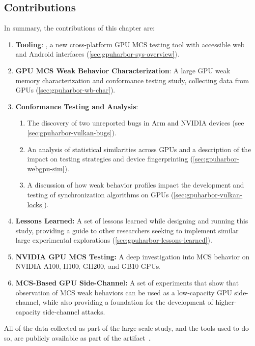 \subsection{Contributions}

In summary, the contributions of this chapter are:
\begin{enumerate}
    \item \textbf{Tooling}: \gpuharbor, a new cross-platform GPU MCS testing tool with accessible web and Android interfaces (\mysec\ref{sec:gpuharbor-sys-overview}).

    \item \textbf{GPU MCS Weak Behavior Characterization}: A large GPU weak memory characterization and conformance testing study, collecting data from \totalDevices GPUs (\mysec\ref{sec:gpuharbor-wb-char}).

    \item \textbf{Conformance Testing and Analysis}:
        \begin{enumerate}
            \item The discovery of two unreported bugs in Arm and NVIDIA devices (see \mysec\ref{sec:gpuharbor-vulkan-bugs}).
            \item An analysis of statistical similarities across GPUs and a description of the impact on testing strategies and device fingerprinting (\mysec\ref{sec:gpuharbor-webgpu-sim}).
            \item A discussion of how weak behavior profiles impact the development and testing of synchronization algorithms on GPUs (\mysec\ref{sec:gpuharbor-vulkan-locks}).
        \end{enumerate}
    \item \textbf{Lessons Learned:} A set of lessons learned while designing and running this study, providing a guide to other researchers seeking to implement similar large experimental explorations (\mysec\ref{sec:gpuharbor-lessons-learned}).
    \item \textbf{NVIDIA GPU MCS Testing:} A deep investigation into MCS behavior on NVIDIA A100, H100, GH200, and GB10 GPUs.
    \item \textbf{MCS-Based GPU Side-Channel:} A set of experiments that show that observation of MCS weak behaviors can be used as a low-capacity GPU side-channel, while also providing a foundation for the development of higher-capacity side-channel attacks.

\end{enumerate}

\noindent
All of the data collected as part of the large-scale study, and the tools used to do so, are publicly available as part of the artifact~\cite{gpuharbor-artifact}.


